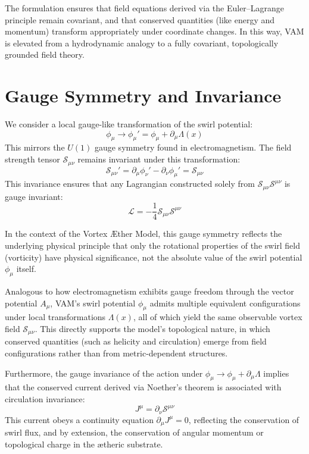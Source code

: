 The formulation ensures that field equations derived via the Euler–Lagrange principle remain covariant, and that conserved quantities (like energy and momentum) transform appropriately under coordinate changes. In this way, VAM is elevated from a hydrodynamic analogy to a fully covariant, topologically grounded field theory.

\section{Gauge Symmetry and Invariance}
We consider a local gauge-like transformation of the swirl potential:
\begin{equation}
    \phi_\mu \rightarrow \phi_\mu' = \phi_\mu + \partial_\mu \Lambda(x)
\end{equation}
This mirrors the $U(1)$ gauge symmetry found in electromagnetism. The field strength tensor $\mathcal{S}_{\mu\nu}$ remains invariant under this transformation:
\begin{equation}
    \mathcal{S}_{\mu\nu}' = \partial_\mu \phi_\nu' - \partial_\nu \phi_\mu' = \mathcal{S}_{\mu\nu}
\end{equation}
This invariance ensures that any Lagrangian constructed solely from $\mathcal{S}_{\mu\nu} \mathcal{S}^{\mu\nu}$ is gauge invariant:
\begin{equation}
    \mathcal{L} = -\frac{1}{4} \mathcal{S}_{\mu\nu} \mathcal{S}^{\mu\nu}
\end{equation}

In the context of the Vortex Æther Model, this gauge symmetry reflects the underlying physical principle that only the
rotational properties of the swirl field (vorticity) have physical significance, not the absolute value of the swirl potential $\phi_\mu$ itself.

Analogous to how electromagnetism exhibits gauge freedom through the vector potential $A_\mu$, VAM's swirl potential $\phi_\mu$ admits multiple equivalent configurations under local transformations $\Lambda(x)$, all of which yield the same observable vortex field $\mathcal{S}_{\mu\nu}$. This directly supports the model's topological nature, in which conserved quantities (such as helicity and circulation) emerge from field configurations rather than from metric-dependent structures.

Furthermore, the gauge invariance of the action under $\phi_\mu \rightarrow \phi_\mu + \partial_\mu \Lambda$ implies that the conserved current derived via Noether's theorem is associated with circulation invariance:
\begin{equation}
    J^\mu = \partial_\nu \mathcal{S}^{\mu\nu}
\end{equation}
This current obeys a continuity equation $\partial_\mu J^\mu = 0$, reflecting the conservation of swirl flux, and by extension, the conservation of angular momentum or topological charge in the ætheric substrate.

